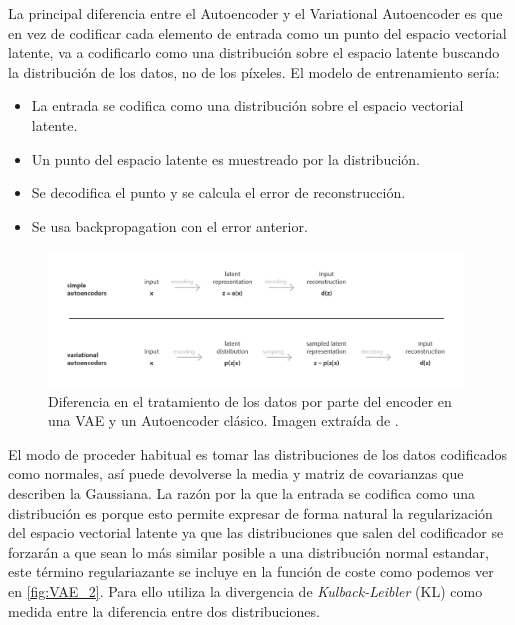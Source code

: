             \medskip

            \noindent La principal diferencia entre el Autoencoder y el Variational Autoencoder es que en vez de codificar cada elemento de entrada como un punto del espacio vectorial latente, va a codificarlo como una distribución sobre el espacio latente buscando la distribución de los datos, no de los píxeles. El modelo de entrenamiento sería:
            
            \begin{itemize}
                \item La entrada se codifica como una distribución sobre el espacio vectorial latente.
                \item Un punto del espacio latente es muestreado por la distribución. 
                \item Se decodifica el punto y se calcula el error de reconstrucción.
                \item Se usa backpropagation con el error anterior.
            \end{itemize}

            \begin{figure}[!h]
                \centering
                \includegraphics[width=0.98\textwidth]{img/vae_1.png}
                \caption{Diferencia en el tratamiento de los datos por parte del encoder en una VAE y un Autoencoder clásico. Imagen extraída de \cite{VAE}.}
                \label{fig:VAE_1}
            \end{figure}

            \noindent El modo de proceder habitual es tomar las distribuciones de los datos codificados como normales, así puede devolverse la media y matriz de covarianzas que describen la Gaussiana. La razón por la que la entrada se codifica como una distribución es porque esto permite expresar de forma natural la regularización del espacio vectorial latente ya que las distribuciones que salen del codificador se forzarán a que sean lo más similar posible a una distribución normal estandar, este término regulariazante se incluye en la función de coste como podemos ver en \autoref{fig:VAE_2}. Para ello utiliza la divergencia de \textit{Kulback-Leibler} (KL) como medida entre la diferencia entre dos distribuciones.

